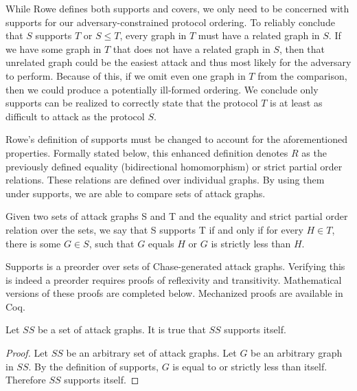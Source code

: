 \documentclass[runningheads]{llncs}
\theoremstyle{definition}
\begin{document}
While Rowe defines both supports and covers, we only need to be concerned with supports for our adversary-constrained protocol ordering. To reliably conclude that $S$ supports $T$ or $S \leq T$, every graph in $T$ must have a related graph in $S$. If we have some graph in $T$ that does not have a related graph in $S$, then that unrelated graph could be the easiest attack and thus most likely for the adversary to perform. Because of this, if we omit even one graph in $T$ from the comparison, then we could produce a potentially ill-formed ordering. We conclude only supports can be realized to correctly state that the protocol $T$ is at least as difficult to attack as the protocol $S$. 

Rowe's \cite{Rowe:2021:OnOrdering} definition of supports must be changed to account for the aforementioned properties. Formally stated below, this enhanced definition denotes $R$ as the previously defined equality (bidirectional homomorphism) or strict partial order relations. These relations are defined over individual graphs. By using them under supports, we are able to compare sets of attack graphs. 

\begin{definition}
    Given two sets of attack graphs S and T and the equality and strict partial order relation over the sets, we say that S supports T if and only if for every $H \in T$, there is some $G \in S$, such that $G$ equals $H$ or $G$ is strictly less than $H$.
\end{definition}


\noindent Supports is a preorder over sets of Chase-generated attack graphs. Verifying this is indeed a preorder requires proofs of reflexivity and transitivity. Mathematical versions of these proofs are completed below. Mechanized proofs are available in Coq.  

\begin{theorem}
    Let $SS$ be a set of attack graphs. It is true that $SS$ supports itself.
\end{theorem}
\begin{proof}    
    Let $SS$ be an arbitrary set of attack graphs. Let $G$ be an arbitrary graph in $SS$. By the definition of supports, $G$ is equal to or strictly less than itself. Therefore $SS$ supports itself. 
\end{proof}
\end{document}
